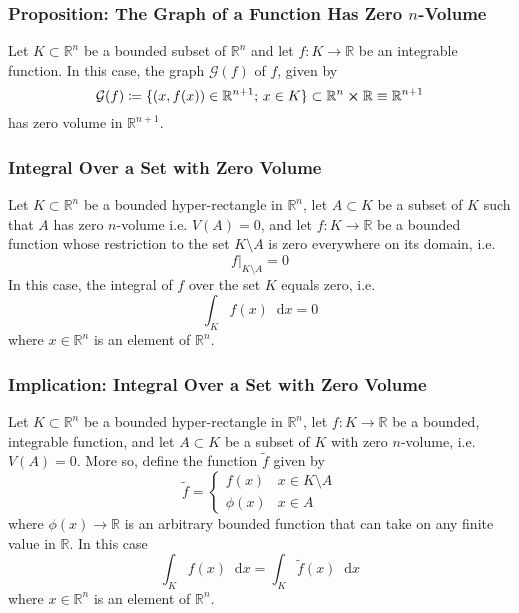 \documentclass[11pt, a4paper]{article}
\newcommand{\diff}{\mathop{}\!\mathrm{d}} %
\begin{document}
\subsubsection{Proposition: The Graph of a Function Has Zero $ n $-Volume }
Let $ K \subset \mathbb{R}^n $ be a bounded subset of $ \mathbb{R}^n $ and let $ f : K  \rightarrow \mathbb{R} $ be an integrable function. In this case, the graph $ \mathcal{G}(f) $ of $ f $, given by
\begin{equation*}
	\mathcal{G}(f) \coloneqq \{(x, f(x)) \in \mathbb{R}^{n+1};\, x \in K \} \subset \mathbb{R}^n \cross \mathbb{R} \equiv \mathbb{R}^{n+1}
\end{equation*}
has zero volume in $ \mathbb{R}^{n+1} $.

\subsubsection{Integral Over a Set with Zero Volume}
Let $ K \subset \mathbb{R}^n $ be a bounded hyper-rectangle in $ \mathbb{R}^n $, let $ A \subset K $ be a subset of $ K $ such that $ A $ has zero $ n $-volume i.e. $ V(A) = 0$, and let $ f : K \rightarrow \mathbb{R} $ be a bounded function whose restriction to the set $ K \setminus A $ is zero everywhere on its domain, i.e.
\begin{equation*}
 \left. f \right|_{K\setminus A} = 0 
\end{equation*}
In this case, the integral of $ f $ over the set $ K $ equals zero, i.e.
\begin{equation*}
	\int_K f(x) \diff x = 0
\end{equation*}
where $ x \in  \mathbb{R}^n $ is an element of $ \mathbb{R}^n $.

\subsubsection{Implication: Integral Over a Set with Zero Volume}
Let $ K \subset \mathbb{R}^n $ be a bounded hyper-rectangle in $  \mathbb{R}^n $, let $ f : K \rightarrow \mathbb{R} $ be a bounded, integrable function, and let $ A \subset K $ be a subset of $ K $ with zero $ n $-volume, i.e. $ V(A) = 0$. More so, define the function $ \tilde{f} $ given by 
\[ \tilde{f} = 
\begin{cases} 
f(x) & x \in K \setminus A \\
\phi(x) & x \in A 
\end{cases}
\]
where $ \phi(x) \rightarrow \mathbb{R}$ is an arbitrary bounded function that can take on any finite value in $ \mathbb{R} $. In this case
\begin{equation*}
	\int_K f(x) \diff x = \int_K \tilde{f}(x) \diff x 
\end{equation*}
where $ x \in  \mathbb{R}^n $ is an element of $ \mathbb{R}^n $.
\end{document}

